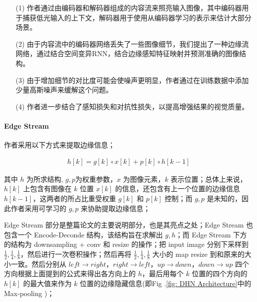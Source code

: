 \documentclass[a4paper, 10pt]{article}
\begin{document}
			\begin{itemize}
				\item[(1)] 
				作者通过由编码器和解码器组成的内容流来照亮输入图像，其中编码器用于捕获低光输入的上下文，解码器用于使用从编码器学习的表示来估计大部分场景。
				
				\item[(2)]
				由于内容流中的编码器网络丢失了一些图像细节，我们提出了一种边缘流网络，通过结合空间变异RNN，结合边缘感知特征映射并预测准确的图像结构。
				
				\item[(3)]
				由于增加细节的对比度可能会使噪声更明显，作者通过在训练数据中添加少量高斯噪声来缓解这个问题。
				
				\item[(4)]
				作者进一步结合了感知损失和对抗性损失，以提高增强结果的视觉质量。
				
			\end{itemize}	
		
			\paragraph{Edge Stream}
			
			作者采用以下方式来提取边缘信息；
			
			\begin{equation}
				\begin{aligned}
					h \left[k\right] = g \left[k\right] \circ x \left[k\right] + p \left[k\right] \circ h \left[k-1\right]
				\end{aligned}
				\label{eq: max and avg}
			\end{equation}
			
		 	其中 $h$ 为所求结构, $g, p$为权重参数，$x$ 为图像元素，$k$ 表示位置；总体上来说，$h\left[k\right]$ 上包含有图像在 $k$ 位置 $x\left[k\right]$ 的信息，还包含有上一个位置的边缘信息 $h\left[k-1\right]$，这两者的所占比重受权重 $g\left[k\right]$ 和 $p\left[k\right]$ 控制；而 $g, p$ 是未知的，因此作者采用可学习的 $g, p$ 来协助提取边缘信息；
		 	
		 	Edge Stream 部分是整篇论文的主要说明部分，也是其亮点之处；Edge Stream 也包含一个 Encode-Deconde 结构，该结构旨在求解出 $g, h$；而 Edge Stream 下方的结构为 downsampling + conv 和 resize 的操作；把 input image 分别下采样到 $\frac{1}{2}, \frac{1}{4}, \frac{1}{8}$，然后进行一次卷积操作；然后再将 $\frac{1}{2}, \frac{1}{4}, \frac{1}{8}$ 大小的 map resize 到和原来的大小一致。然后分别从 $left \rightarrow right$，$right \rightarrow left$，$up \rightarrow down$，$down \rightarrow up$ 四个方向根据上面提到的公式来得出各方向上的 $h$，最后用每个 $k$ 位置的四个方向的 $h\left[k\right]$ 的最大值来作为 $k$ 位置的边缘隐藏信息(即Fig .\ref{fig: DHN Architecture}中的 Max-pooling )；
\end{document}
